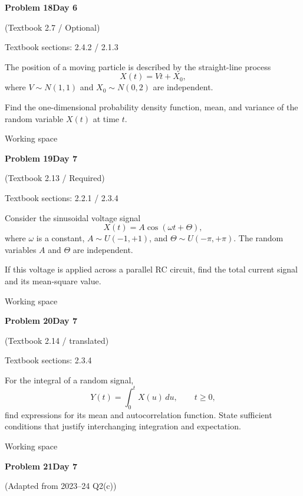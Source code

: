 \documentclass[11pt]{article}
\newcommand{\qtitle}[2]{\clearpage\begin{tcolorbox}[colback=navy,colframe=navy,arc=1.5pt,boxrule=0pt]\color{white}\large\bfseries #1\hfill\small #2\end{tcolorbox}}
\begin{document}
\qtitle{Problem 18}{Day 6}
{\small\color{accentred}(Textbook 2.7 / Optional)}\par\smallskip
{\small\color{muted}Textbook sections: 2.4.2 / 2.1.3}\par\medskip
\begin{tcolorbox}[colback=qbg,colframe=qbg,boxrule=0pt]The position of a moving particle is described by the straight-line process
\[
X(t)=Vt+X_0,
\]
where $V\sim N(1,1)$ and $X_0\sim N(0,2)$ are independent.

Find the one-dimensional probability density function, mean, and variance of the random variable $X(t)$ at time $t$.
\end{tcolorbox}\smallskip\begin{workspace}\hfill{\color{linec}\footnotesize Working space}\end{workspace}
\qtitle{Problem 19}{Day 7}
{\small\color{accentred}(Textbook 2.13 / Required)}\par\smallskip
{\small\color{muted}Textbook sections: 2.2.1 / 2.3.4}\par\medskip
\begin{tcolorbox}[colback=qbg,colframe=qbg,boxrule=0pt]Consider the sinusoidal voltage signal
\[
X(t)=A\cos(\omega t+\Theta),
\]
where $\omega$ is a constant, $A\sim U(-1,+1)$, and $\Theta\sim U(-\pi,+\pi)$. The random variables $A$ and $\Theta$ are independent.

If this voltage is applied across a parallel RC circuit, find the total current signal and its mean-square value.
\end{tcolorbox}\smallskip\begin{workspace}\hfill{\color{linec}\footnotesize Working space}\end{workspace}
\qtitle{Problem 20}{Day 7}
{\small\color{accentred}(Textbook 2.14 / translated)}\par\smallskip
{\small\color{muted}Textbook sections: 2.3.4}\par\medskip
\begin{tcolorbox}[colback=qbg,colframe=qbg,boxrule=0pt]For the integral of a random signal,
\[Y(t)=\int_0^t X(u)\,du,\qquad t\ge0,\]
find expressions for its mean and autocorrelation function. State sufficient conditions that justify interchanging integration and expectation.
\end{tcolorbox}\smallskip\begin{workspace}\hfill{\color{linec}\footnotesize Working space}\end{workspace}
\qtitle{Problem 21}{Day 7}
{\small\color{accentred}(Adapted from 2023--24 Q2(c))}\par\smallskip
\end{document}
